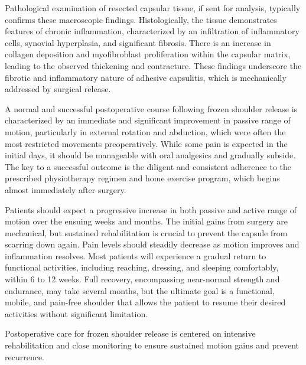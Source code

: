 Pathological examination of resected capsular tissue, if sent for analysis, typically confirms these macroscopic findings. Histologically, the tissue demonstrates features of chronic inflammation, characterized by an infiltration of inflammatory cells, synovial hyperplasia, and significant fibrosis. There is an increase in collagen deposition and myofibroblast proliferation within the capsular matrix, leading to the observed thickening and contracture. These findings underscore the fibrotic and inflammatory nature of adhesive capsulitis, which is mechanically addressed by surgical release.

A normal and successful postoperative course following frozen shoulder release is characterized by an immediate and significant improvement in passive range of motion, particularly in external rotation and abduction, which were often the most restricted movements preoperatively. While some pain is expected in the initial days, it should be manageable with oral analgesics and gradually subside. The key to a successful outcome is the diligent and consistent adherence to the prescribed physiotherapy regimen and home exercise program, which begins almost immediately after surgery.

Patients should expect a progressive increase in both passive and active range of motion over the ensuing weeks and months. The initial gains from surgery are mechanical, but sustained rehabilitation is crucial to prevent the capsule from scarring down again. Pain levels should steadily decrease as motion improves and inflammation resolves. Most patients will experience a gradual return to functional activities, including reaching, dressing, and sleeping comfortably, within 6 to 12 weeks. Full recovery, encompassing near-normal strength and endurance, may take several months, but the ultimate goal is a functional, mobile, and pain-free shoulder that allows the patient to resume their desired activities without significant limitation.

Postoperative care for frozen shoulder release is centered on intensive rehabilitation and close monitoring to ensure sustained motion gains and prevent recurrence.

